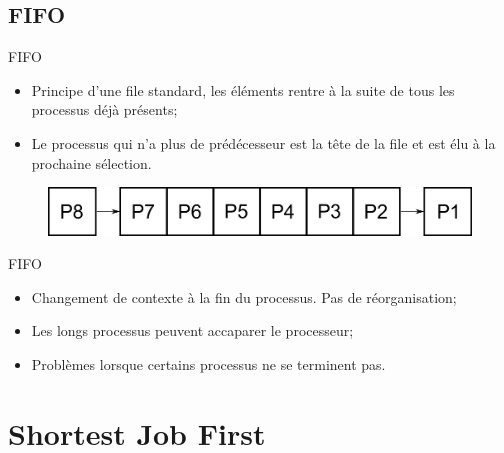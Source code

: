 \begin{frame}{\sectitle}

\def\subsectitle{FIFO}
\subsection{\subsectitle}

\begin{block}{\subsectitle}
\begin{itemize}
    \item Principe d'une file standard, les éléments rentre à la suite de tous
    les processus déjà présents;
    \item Le processus qui n'a plus de prédécesseur est la tête de la file et
    est élu à la prochaine sélection.
\end{itemize}
\end{block}


\begin{figure}
\includegraphics[width=\textwidth]{images/FIFO.pdf}
\end{figure}

\begin{exampleblock}{\subsectitle}
\begin{itemize}
    \item Changement de contexte à la fin du processus. Pas de réorganisation;
    \item Les longs processus peuvent accaparer le processeur;
    \item Problèmes lorsque certains processus ne se terminent pas.
\end{itemize}
\end{exampleblock}

\end{frame}


\def\sectitle{Shortest Job First}
\section{\sectitle}


